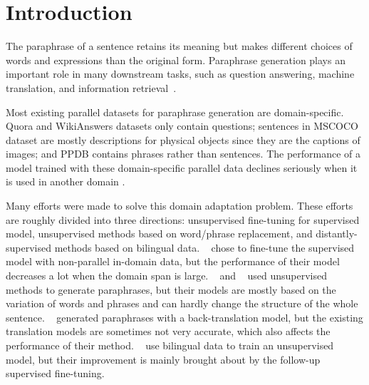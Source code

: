 \section{Introduction}
The paraphrase of a sentence retains its meaning but makes different choices
of words and expressions than the original form. 
Paraphrase generation plays an important role in many downstream tasks, 
such as question answering, machine translation, and information 
retrieval~\cite{hu2019improved}. 

Most existing parallel datasets for paraphrase generation are 
domain-specific. Quora and WikiAnswers \cite{fader2013paraphrase} datasets 
only contain questions; sentences in MSCOCO \cite{lin2014microsoft} dataset 
are mostly descriptions for physical objects since they are the captions of 
images; 
and PPDB \cite{ganitkevitch2013ppdb} contains phrases rather than sentences. 
The performance of a model trained with these domain-specific parallel data 
declines seriously when it is used in another domain \cite{li2019decomposable}. 

Many efforts were made to solve this domain adaptation problem. These efforts are roughly divided into three directions: unsupervised fine-tuning for supervised model, unsupervised methods based on word/phrase replacement, and distantly-supervised methods based on bilingual data.
\citeauthor{li2019decomposable}~ chose to fine-tune the supervised model with non-parallel in-domain data, but the performance of their model decreases a lot when the domain span is large.
\citeauthor{liu2019unsupervised}~ and \citeauthor{miao2019cgmh}~ used unsupervised methods to generate paraphrases, but their models are mostly based on the variation of 
words and phrases and can hardly change the structure of the whole sentence. 
\citeauthor{wieting2017paranmt}~ generated paraphrases with a back-translation model, but the existing translation models are sometimes not very accurate, which also affects the performance of their method. \citeauthor{liu2020exploring}~ use bilingual data to train an unsupervised model, but their improvement is mainly brought about by the follow-up supervised fine-tuning.

